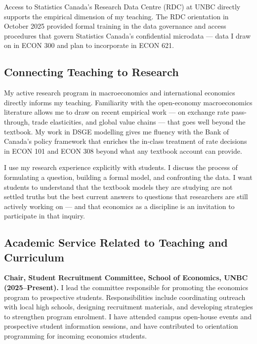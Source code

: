 \documentclass[11pt,letterpaper]{article}
\begin{document}
\vspace{6pt}

Access to Statistics Canada's Research Data Centre (RDC) at UNBC directly supports the empirical dimension of my teaching. The RDC orientation in October 2025 provided formal training in the data governance and access procedures that govern Statistics Canada's confidential microdata --- data I draw on in ECON 300 and plan to incorporate in ECON 621.

\subsection{Connecting Teaching to Research}

My active research program in macroeconomics and international economics directly informs my teaching. Familiarity with the open-economy macroeconomics literature allows me to draw on recent empirical work --- on exchange rate pass-through, trade elasticities, and global value chains --- that goes well beyond the textbook. My work in DSGE modelling gives me fluency with the Bank of Canada's policy framework that enriches the in-class treatment of rate decisions in ECON 101 and ECON 308 beyond what any textbook account can provide.

I use my research experience explicitly with students. I discuss the process of formulating a question, building a formal model, and confronting the data. I want students to understand that the textbook models they are studying are not settled truths but the best current answers to questions that researchers are still actively working on --- and that economics as a discipline is an invitation to participate in that inquiry.

\subsection{Academic Service Related to Teaching and Curriculum}

\textbf{Chair, Student Recruitment Committee, School of Economics, UNBC (2025--Present).}
I lead the committee responsible for promoting the economics program to prospective students. Responsibilities include coordinating outreach with local high schools, designing recruitment materials, and developing strategies to strengthen program enrolment. I have attended campus open-house events and prospective student information sessions, and have contributed to orientation programming for incoming economics students.
\end{document}
